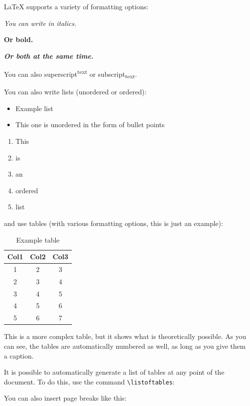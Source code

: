 \documentclass[
  12pt,
  a4paper,
]{article}
\providecommand{\tightlist}{%
  \setlength{\itemsep}{0pt}\setlength{\parskip}{0pt}}\usepackage{longtable,booktabs,array}
\begin{document}
LaTeX supports a variety of formatting options:

\emph{You can write in italics.}

\textbf{Or bold.}

\textbf{\emph{Or both at the same time.}}

You can also superscript\textsuperscript{text} or subscript\textsubscript{text}.

You can also write lists (unordered or ordered):

\begin{itemize}
\tightlist
\item
    Example list
\item 
    This one is unordered in the form of bullet points
\end{itemize}

\begin{enumerate}
\tightlist
\item
    This
\item
    is
\item
    an
\item
    ordered
\item
    list
\end{enumerate}

and use tables (with various formatting options, this is just an example):

\begin{table}[h!]
\centering
\begin{tabular}{|c c c|} 
 \hline
 Col1 & Col2 & Col3 \\ [0.5ex] 
 \hline\hline
 1 & 2 & 3 \\ 
 2 & 3 & 4 \\
 3 & 4 & 5 \\
 4 & 5 & 6 \\
 5 & 6 & 7 \\ [1ex] 
 \hline
\end{tabular}
\caption{Example table}
\end{table}

This is a more complex table, but it shows what is theoretically possible. As you can see, the tables are automatically numbered as well, as long as you give them a caption.

It is possible to automatically generate a list of tables at any point of the document. To do this, use the command \texttt{\textbackslash{listoftables}}:

\listoftables

You can also insert page breaks like this:
\end{document}
